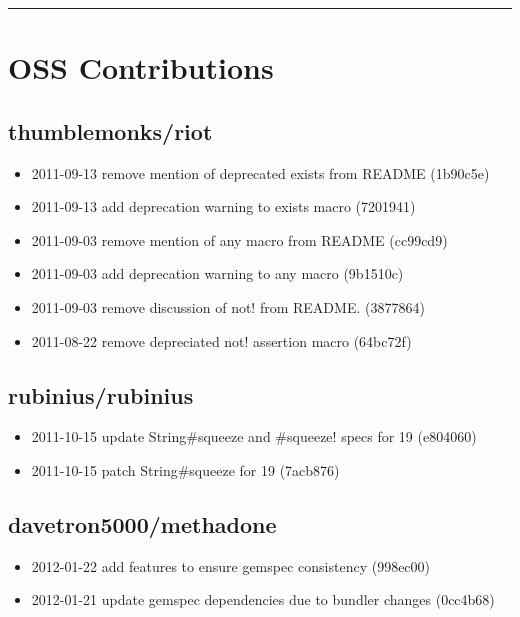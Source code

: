 \documentclass{article}
\begin{document}
\hrule
\section{OSS Contributions} %
\label{sec:OSS Contributions}

\begin{multicols}{2}
  \begin{raggedright}
  \subsection{thumblemonks/riot} %
  \label{sub:thumblemonks/riot}

  \begin{itemize}
    \item2011-09-13 remove mention of deprecated exists from README (1b90c5e)
    \item2011-09-13 add deprecation warning to exists macro (7201941)
    \item2011-09-03 remove mention of any macro from README (cc99cd9)
    \item2011-09-03 add deprecation warning to any macro (9b1510c)
    \item2011-09-03 remove discussion of not! from README. (3877864)
    \item2011-08-22 remove depreciated not! assertion macro (64bc72f)
  \end{itemize}

  \subsection{rubinius/rubinius} %
  \label{sub:rubinius/rubinius}

  \begin{itemize}
    \item2011-10-15 update String\#squeeze and \#squeeze! specs for 19 (e804060)
    \item2011-10-15 patch String\#squeeze for 19 (7acb876)
  \end{itemize}
  
  \subsection{davetron5000/methadone} %
  \label{sub:davetron5000/methadone}
  
  \begin{itemize}
    \item2012-01-22 add features to ensure gemspec consistency (998ec00)
    \item2012-01-21 update gemspec dependencies due to bundler changes (0cc4b68)
  \end{itemize}

  \end{raggedright}
\end{multicols}

\end{document}
